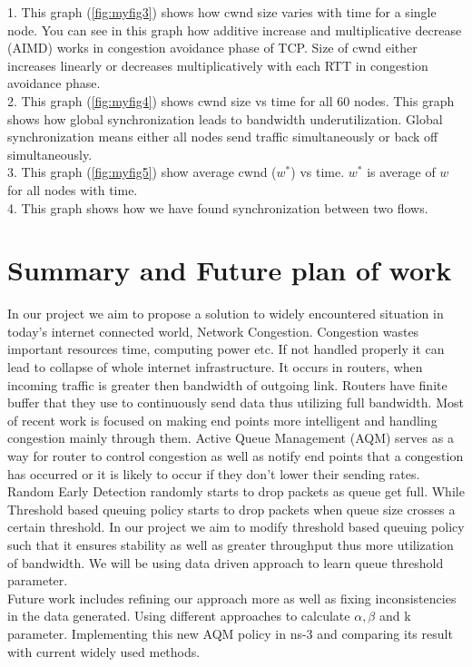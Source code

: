 1. This graph (\ref{fig:myfig3}) shows how cwnd size varies with time for a single node. You can see in this graph how additive increase and multiplicative decrease (AIMD) works in congestion avoidance phase of TCP. Size of cwnd either increases linearly or decreases multiplicatively with each RTT in congestion avoidance phase.\\ %
2. This graph (\ref{fig:myfig4}) shows cwnd size vs time for all 60 nodes. This graph shows how global synchronization leads to bandwidth underutilization. Global synchronization means either all nodes send traffic simultaneously or back off simultaneously. \\ %
3. This graph (\ref{fig:myfig5}) show average cwnd ($ w^* $) vs time. $ w^* $ is average of $ w $ for all nodes with time. \\ %
4. This graph shows how we have found synchronization between two flows.

\clearpage
\section{Summary and Future plan of work}
In our project we aim to propose a solution to widely encountered situation in today's internet connected world, Network Congestion. Congestion wastes important resources time, computing power etc. If not handled properly it can lead to collapse of whole internet infrastructure. It occurs in routers, when incoming traffic is greater then bandwidth of outgoing link. Routers have finite buffer that they use to continuously send data thus utilizing full bandwidth. Most of recent work is focused on making end points more intelligent and handling congestion mainly through them. Active Queue Management (AQM) serves as a way for router to control congestion as well as notify end points that a congestion has occurred or it is likely to occur if they don't lower their sending rates. Random Early Detection randomly starts to drop packets as queue get full. While Threshold based queuing policy starts to drop packets when queue size crosses a certain threshold. In our project we aim to modify threshold based queuing policy such that it ensures stability as well as greater throughput thus more utilization of bandwidth. We will be using data driven approach to learn queue threshold parameter.\\
Future work includes refining our approach more as well as fixing inconsistencies in the data generated. Using different approaches to calculate \( \alpha, \beta \) and k parameter. Implementing this new AQM policy in ns-3 and comparing its result with current widely used methods.\\


\clearpage


